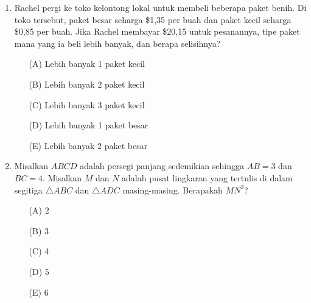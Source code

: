 \documentclass[12pt]{scrartcl}
\begin{document}
\begin{enumerate}
    \item Rachel pergi ke toko kelontong lokal untuk membeli beberapa paket benih. Di toko tersebut, paket besar seharga \$1,35 per buah dan paket kecil seharga \$0,85 per buah. Jika Rachel membayar \$20,15 untuk pesanannya, tipe paket mana yang ia beli lebih banyak, dan berapa selisihnya?
    \begin{itemize}
        \item[(A)] Lebih banyak 1 paket kecil
        \item[(B)] Lebih banyak 2 paket kecil
        \item[(C)] Lebih banyak 3 paket kecil
        \item[(D)] Lebih banyak 1 paket besar
        \item[(E)] Lebih banyak 2 paket besar
    \end{itemize}

    \item Misalkan $ABCD$ adalah persegi panjang sedemikian sehingga $AB=3$ dan $BC=4$. Misalkan $M$ dan $N$ adalah pusat lingkaran yang tertulis di dalam segitiga $\triangle ABC$ dan $\triangle ADC$ masing-masing. Berapakah $MN^{2}$?
        \begin{center}
    \end{center}
    \begin{itemize}
        \item[(A)] 2
        \item[(B)] 3
        \item[(C)] 4
        \item[(D)] 5
        \item[(E)] 6
    \end{itemize}


\end{enumerate}
\end{document}
